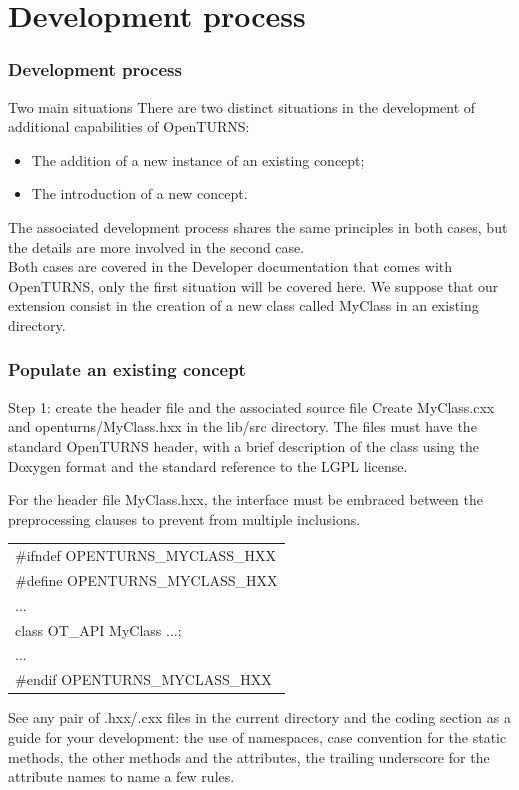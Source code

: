 \documentclass[8pt]{beamer}
\begin{document}
\section[Development process]{Development process}
\begin{frame}
  \frametitle{Development process}
  \begin{block}{Two main situations}
    There are two distinct situations in the development of additional capabilities of OpenTURNS:
    \begin{itemize}
      \item The addition of a new instance of an existing concept;
      \item The introduction of a new concept.
    \end{itemize}
    The associated development process shares the same principles in both cases, but the details are more involved in the second case.\\
    Both cases are covered in the \alert{Developer} documentation that comes with OpenTURNS, only the first situation will be covered here. We suppose that our extension consist in the creation of a new class called MyClass in an existing directory.
  \end{block}
\end{frame}
\begin{frame}
  \frametitle{Populate an existing concept}
  \begin{block}{Step 1: create the header file and the associated source file}
    Create MyClass.cxx and openturns/MyClass.hxx in the lib/src directory. The files must have the standard OpenTURNS header, with a brief description of the class using the Doxygen format and the standard reference to the LGPL license.
  
  For the header file MyClass.hxx, the interface must be embraced between the preprocessing clauses to prevent from multiple inclusions.
  
\begin{tabular}{l}
\ttfamily \#ifndef OPENTURNS\_MYCLASS\_HXX\\
\ttfamily \#define OPENTURNS\_MYCLASS\_HXX\\
\ttfamily ...\\
\ttfamily class OT\_API MyClass {...};\\
\ttfamily ...\\
\ttfamily \#endif OPENTURNS\_MYCLASS\_HXX
\end{tabular}

  See any pair of .hxx/.cxx files in the current directory and the coding section as a guide for your development: the use of namespaces, case convention for the static methods, the other methods and the attributes, the trailing underscore for the attribute names to name a few rules.
  \end{block}
\end{frame}
\end{document}
